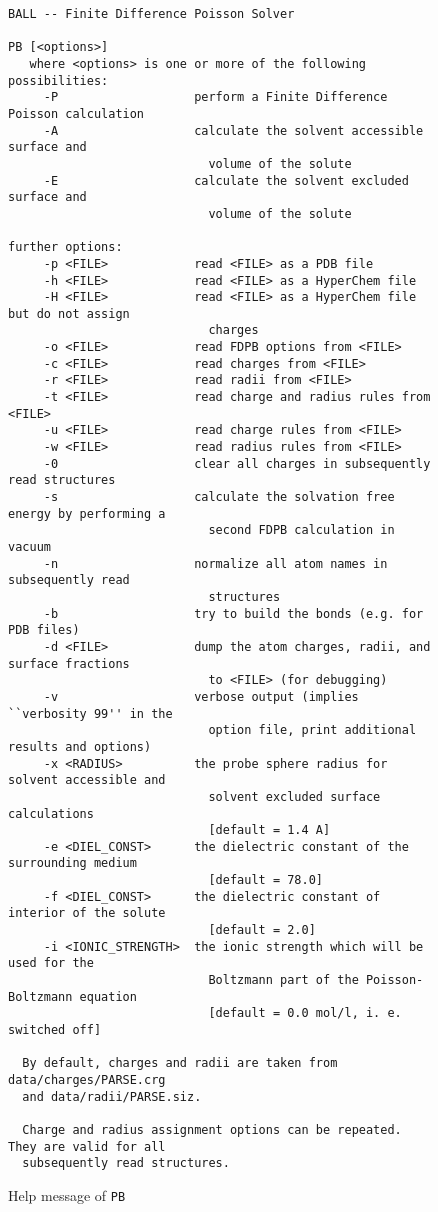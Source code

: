 \documentclass[12pt,twoside,a4paper]{article}
\begin{document}
\begin{figure}
\scriptsize
\begin{verbatim}
BALL -- Finite Difference Poisson Solver

PB [<options>]
   where <options> is one or more of the following possibilities:
     -P                   perform a Finite Difference Poisson calculation
     -A                   calculate the solvent accessible surface and
                            volume of the solute
     -E                   calculate the solvent excluded surface and
                            volume of the solute

further options:
     -p <FILE>            read <FILE> as a PDB file
     -h <FILE>            read <FILE> as a HyperChem file
     -H <FILE>            read <FILE> as a HyperChem file but do not assign
                            charges
     -o <FILE>            read FDPB options from <FILE>
     -c <FILE>            read charges from <FILE>
     -r <FILE>            read radii from <FILE>
     -t <FILE>            read charge and radius rules from <FILE>
     -u <FILE>            read charge rules from <FILE>
     -w <FILE>            read radius rules from <FILE>
     -0                   clear all charges in subsequently read structures
     -s                   calculate the solvation free energy by performing a 
                            second FDPB calculation in vacuum
     -n                   normalize all atom names in subsequently read
                            structures
     -b                   try to build the bonds (e.g. for PDB files)
     -d <FILE>            dump the atom charges, radii, and surface fractions
                            to <FILE> (for debugging)
     -v                   verbose output (implies ``verbosity 99'' in the
                            option file, print additional results and options)
     -x <RADIUS>          the probe sphere radius for solvent accessible and
                            solvent excluded surface calculations
                            [default = 1.4 A]
     -e <DIEL_CONST>      the dielectric constant of the surrounding medium
                            [default = 78.0]
     -f <DIEL_CONST>      the dielectric constant of interior of the solute
                            [default = 2.0]
     -i <IONIC_STRENGTH>  the ionic strength which will be used for the
                            Boltzmann part of the Poisson-Boltzmann equation
                            [default = 0.0 mol/l, i. e.  switched off]

  By default, charges and radii are taken from data/charges/PARSE.crg
  and data/radii/PARSE.siz.

  Charge and radius assignment options can be repeated. They are valid for all
  subsequently read structures.

\end{verbatim}
\normalsize
\caption{Help message of {\tt PB}}
\label{helpmessage}
\end{figure}
\end{document}
